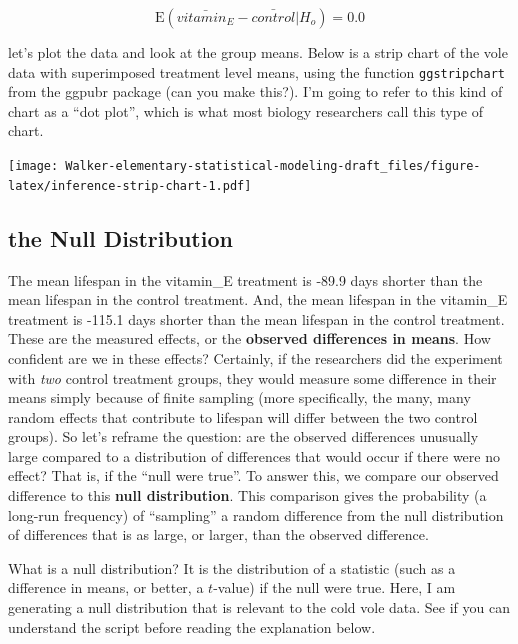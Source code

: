 \documentclass[]{book}
\theoremstyle{definition}
\theoremstyle{definition}
\theoremstyle{definition}
\theoremstyle{remark}
\begin{document}
\begin{equation}
\mathrm{E}(\bar{vitamin_E} - \bar{control} | H_o) = 0.0
\end{equation}

let's plot the data and look at the group means. Below is a strip chart
of the vole data with superimposed treatment level means, using the
function \texttt{ggstripchart} from the ggpubr package (can you make
this?). I'm going to refer to this kind of chart as a ``dot plot'',
which is what most biology researchers call this type of chart.

\texttt{[image: Walker-elementary-statistical-modeling-draft\_files/figure-latex/inference-strip-chart-1.pdf]}

\subsection{the Null Distribution}\label{the-null-distribution}

The mean lifespan in the vitamin\_E treatment is -89.9 days shorter than
the mean lifespan in the control treatment. And, the mean lifespan in
the vitamin\_E treatment is -115.1 days shorter than the mean lifespan
in the control treatment. These are the measured effects, or the
\textbf{observed differences in means}. How confident are we in these
effects? Certainly, if the researchers did the experiment with
\emph{two} control treatment groups, they would measure some difference
in their means simply because of finite sampling (more specifically, the
many, many random effects that contribute to lifespan will differ
between the two control groups). So let's reframe the question: are the
observed differences unusually large compared to a distribution of
differences that would occur if there were no effect? That is, if the
``null were true''. To answer this, we compare our observed difference
to this \textbf{null distribution}. This comparison gives the
probability (a long-run frequency) of ``sampling'' a random difference
from the null distribution of differences that is as large, or larger,
than the observed difference.

What is a null distribution? It is the distribution of a statistic (such
as a difference in means, or better, a \(t\)-value) if the null were
true. Here, I am generating a null distribution that is relevant to the
cold vole data. See if you can understand the script before reading the
explanation below.
\end{document}
